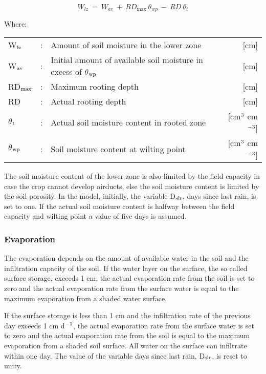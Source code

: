 \begin{equation}
W_{lz} ~ =~ W _{av} ~+~ RD_{\max } ~\theta_{wp} ~-~RD~\theta_{t} 
\end{equation}

Where:\\[5pt]
\begin{tabularx}{\textwidth}{llXr}
 W$_{{\rm lz}}$ &:& Amount of soil moisture in the lower zone & [cm]\\
 W$_{{\rm av}}$ &:& Initial amount of available soil moisture 
    in excess of $\theta$$_{{\rm wp}}$ & [cm]\\
 RD$_{{\rm max}}$ &:& Maximum rooting depth & [cm]\\
 RD &:& Actual rooting depth & [cm]\\
 $\theta$$_{{\rm t}}$ &:& Actual soil moisture content in rooted zone  
     & [cm$^{{\rm 3}}$ cm$^{{\rm -3}}$]\\
 $\theta$$_{{\rm wp}}$ &:& Soil moisture content at wilting point  
     & [cm$^{{\rm 3}}$ cm$^{{\rm -3}}$]\\
\end{tabularx}

The soil moisture content of the lower zone is also limited by the field capacity in case
the crop cannot develop airducts, else the soil moisture content is limited by the soil
porosity. In the model, initially, the variable D$_{{\rm slr}}$, days since last rain, is set to one. If the
actual soil moisture content is halfway between the field capacity and wilting point a
value of five days is assumed. 

\subsubsection{Evaporation}
The evaporation depends on the amount of available water in the soil and the infiltration
capacity of the soil. If the water layer on the surface, the so called surface storage, 
exceeds 1 cm, the actual evaporation rate from the soil is set to zero and the actual
evaporation rate from the surface water is equal to the maximum evaporation from a
shaded water surface.

If the surface storage is less than 1 cm and the infiltration rate of the previous day
exceeds 1 cm d$^{{\rm -1}}$, the actual evaporation rate from the surface water is set to zero and the
actual evaporation rate from the soil is equal to the maximum evaporation from a shaded
soil surface. All water on the surface can infiltrate within one day. The value of the
variable days since last rain, D$_{{\rm slr}}$, is reset to unity.

